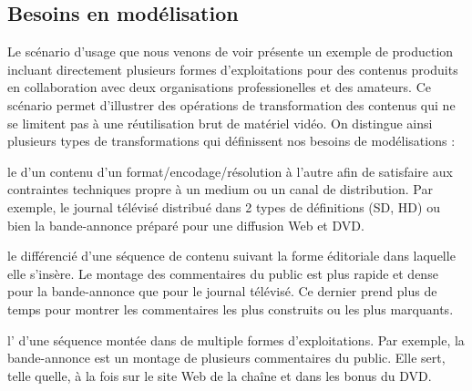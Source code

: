 

\subsection{Besoins en modélisation}\label{sec:bm-av}
Le scénario d'usage que nous venons de voir présente un exemple de production incluant directement plusieurs formes d'exploitations pour des contenus produits en collaboration avec deux organisations professionelles et des amateurs. 
Ce scénario permet d'illustrer des opérations de transformation des contenus qui ne se limitent pas à une réutilisation brut de matériel vidéo. 
On distingue ainsi plusieurs types de transformations qui définissent nos besoins de modélisations :
\begin{liste}
	\item le  d'un contenu d'un format/encodage/résolution à l'autre afin de satisfaire aux contraintes techniques propre à un medium ou un canal de distribution. 
	Par exemple, le journal télévisé distribué dans 2 types de définitions (SD, HD) ou bien la bande-annonce préparé pour une diffusion Web et DVD.

	\item le  différencié d'une séquence de contenu suivant la forme éditoriale dans laquelle elle s'insère.
	Le montage des commentaires du public est plus rapide et dense pour la bande-annonce que pour le journal télévisé. 
	Ce dernier prend plus de temps pour montrer les commentaires les plus construits ou les plus marquants.

	\item l' d'une séquence montée dans de multiple formes d'exploitations. 
	Par exemple, la bande-annonce est un montage de plusieurs commentaires du public. 
	Elle sert, telle quelle, à la fois sur le site Web de la chaîne et dans les bonus du DVD. 
\end{liste}

